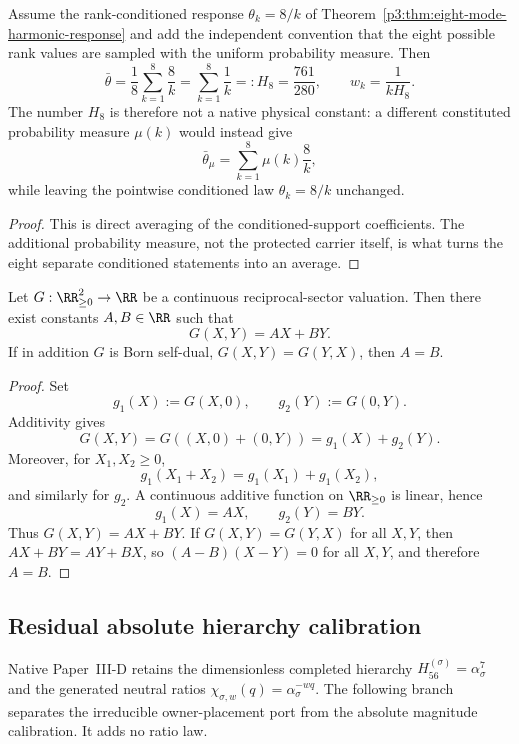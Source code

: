 \documentclass[11pt,a4paper]{article}
\begin{document}
\begin{corollary}
\label{p3:cor:H8-status}
Assume the rank-conditioned response
\(\theta_k=8/k\) of Theorem~\ref{p3:thm:eight-mode-harmonic-response} and add
the independent convention that the eight possible rank values are sampled
with the uniform probability measure.  Then
\begin{equation}
\label{p3:eq:H8-response-export}
 \bar\theta
 =\frac18\sum_{k=1}^{8}\frac8k
 =\sum_{k=1}^{8}\frac1k
 =:H_8
 =\frac{761}{280},
 \qquad
 w_k=\frac1{kH_8}.
\end{equation}
The number \(H_8\) is therefore not a native physical constant: a different
constituted probability measure \(\mu(k)\) would instead give
\[
 \bar\theta_\mu=\sum_{k=1}^{8}\mu(k)\frac8k,
\]
while leaving the pointwise conditioned law \(\theta_k=8/k\) unchanged.
\end{corollary}

\begin{proof}
This is direct averaging of the conditioned-support coefficients.  The
additional probability measure, not the protected carrier itself, is what
turns the eight separate conditioned statements into an average.
\end{proof}

\begin{lemma}
\label{p3:lem:sector-valuation-linear}
Let \(G:\RR_{\ge0}^2\to\RR\) be a continuous reciprocal-sector valuation.  Then there exist
constants \(A,B\in\RR\) such that
\[
        G(X,Y)=A X+B Y .
\]
If in addition \(G\) is Born self-dual, \(G(X,Y)=G(Y,X)\), then \(A=B\).
\end{lemma}

\begin{proof}
Set
\[
        g_1(X):=G(X,0),
        \qquad
        g_2(Y):=G(0,Y).
\]
Additivity gives
\[
        G(X,Y)=G((X,0)+(0,Y))=g_1(X)+g_2(Y).
\]
Moreover, for \(X_1,X_2\ge0\),
\[
        g_1(X_1+X_2)=g_1(X_1)+g_1(X_2),
\]
and similarly for \(g_2\).  A continuous additive function on \(\RR_{\ge0}\) is linear, hence
\[
        g_1(X)=AX,
        \qquad
        g_2(Y)=BY.
\]
Thus \(G(X,Y)=AX+BY\).  If \(G(X,Y)=G(Y,X)\) for all \(X,Y\), then
\(AX+BY=AY+BX\), so \((A-B)(X-Y)=0\) for all \(X,Y\), and therefore \(A=B\).
\end{proof}



\subsection{Residual absolute hierarchy calibration}
\label{p3d:app:hierarchy-placement}
Native Paper~III-D retains the dimensionless completed hierarchy
\(H_{56}^{(\sigma)}=\alpha_\sigma^{7}\) and the generated neutral ratios
\(\chi_{\sigma,w}(q)=\alpha_\sigma^{-wq}\).  The following branch separates
the irreducible owner-placement port from the absolute magnitude calibration.
It adds no ratio law.
\end{document}
